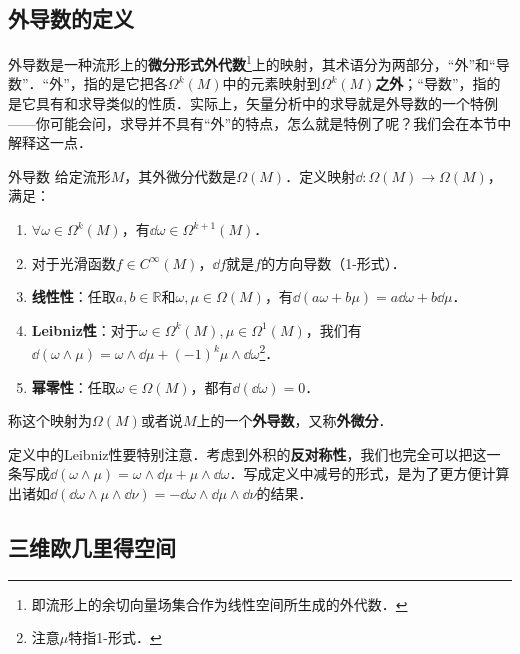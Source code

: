

\subsection{外导数的定义}

外导数是一种流形上的\textbf{微分形式外代数}\footnote{即流形上的余切向量场集合作为线性空间所生成的外代数．}上的映射，其术语分为两部分，“外”和“导数”．“外”，指的是它把各$\Omega^k(M)$中的元素映射到$\Omega^k(M)$\textbf{之外}；“导数”，指的是它具有和求导类似的性质．实际上，矢量分析中的求导就是外导数的一个特例——你可能会问，求导并不具有“外”的特点，怎么就是特例了呢？我们会在本节中解释这一点．

\begin{definition}{外导数}\label{ExtDer_def1}
给定流形$M$，其外微分代数是$\Omega (M)$．定义映射$\dd:\Omega (M)\rightarrow\Omega (M)$，满足：
\begin{enumerate}
\item $\forall \omega\in\Omega^k(M)$，有$\dd \omega\in\Omega^{k+1}(M)$．
\item 对于光滑函数$f\in C^\infty(M)$，$\dd f$就是$f$的方向导数（1-形式）．
\item \textbf{线性性}：任取$a, b\in \mathbb{R}$和$\omega, \mu\in\Omega(M)$，有$\dd(a\omega+b\mu)=a\dd\omega+b\dd\mu$．
\item \textbf{Leibniz性}：对于$\omega\in\Omega^k(M), \mu\in\Omega^1(M)$，我们有$\dd(\omega\wedge\mu)=\omega\wedge\dd\mu+(-1)^k\mu\wedge\dd\omega$\footnote{注意$\mu$特指1-形式．}．
\item \textbf{幂零性}：任取$\omega\in\Omega(M)$，都有$\dd(\dd\omega)=0$．
\end{enumerate}
称这个映射为$\Omega (M)$或者说$M$上的一个\textbf{外导数}，又称\textbf{外微分}．
\end{definition}

定义中的Leibniz性要特别注意．考虑到外积的\textbf{反对称性}，我们也完全可以把这一条写成$\dd(\omega\wedge\mu)=\omega\wedge\dd\mu+\mu\wedge\dd\omega$．写成定义中减号的形式，是为了更方便计算出诸如$\dd(\dd\omega\wedge\mu\wedge\dd\nu)=-\dd\omega\wedge\dd\mu\wedge\dd\nu$的结果．



\subsection{三维欧几里得空间}

